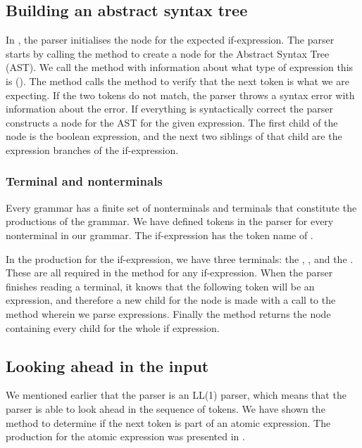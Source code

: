 \subsection{Building an abstract syntax tree}
In , the parser initialises the node for the
expected if-expression. The parser starts by calling the method
 to create a node for the Abstract Syntax Tree (AST).
We call the method with information about what type of expression this
is (). The method calls the  method
to verify that the next token is what we are expecting. If the two
tokens do not match, the parser throws a syntax error with information
about the error. If everything is syntactically correct the parser
constructs a node for the AST for the given expression. The first child
of the node is the boolean expression, and the next two siblings of that
child are the expression branches of the if-expression.

\subsubsection{Terminal and nonterminals}
Every grammar has a finite set of nonterminals and terminals that
constitute the productions of the grammar. We have defined tokens in the
parser for every nonterminal in our grammar. The if-expression has the
token name of .

In the production for the if-expression, we have three terminals: the ,
, and the . These are all required in the method for any
if-expression. When the parser finishes reading a terminal, it knows that the
following token will be an expression, and therefore a new child for the node is
made with a call to the  method wherein we parse
expressions. Finally the method returns the node containing every child for the
whole if expression.

\subsection{Looking ahead in the input}
We mentioned earlier that the parser is an LL(1) parser, which means that the
parser is able to look ahead in the sequence of tokens. We have shown the
 method to determine if the next token is part of an
atomic expression. The production for the atomic expression was presented in
.

